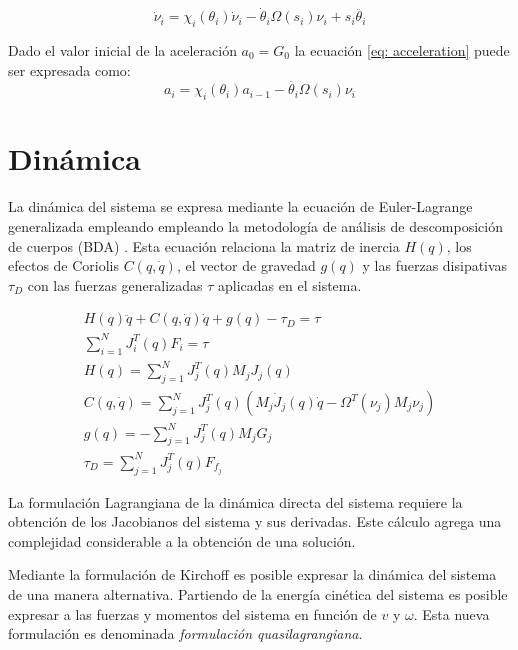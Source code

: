 \begin{equation}\label{eq: acceleration}
\dot \nu_i = \chi_i(\theta_i)\dot{\nu}_i - \dot \theta_i \Omega(s_i) \nu_i+ s_i\ddot{\theta_i}
\end{equation}

Dado el valor inicial de la aceleración 
$a_0 = G_0$ la ecuación \eqref{eq: acceleration} 
puede ser expresada como:
\begin{equation}
a_i = \chi_i(\theta_i) a_{i-1} - \dot{\theta_i}\Omega(s_i) \nu_i
\end{equation}

\section{Dinámica}

La dinámica del sistema se expresa mediante la ecuación 
de Euler-Lagrange generalizada empleando empleando la metodología 
de análisis de descomposición de cuerpos (BDA) \cite{olguin2019multibody}. 
Esta ecuación relaciona la matriz de inercia $H(q)$,
los efectos de Coriolis $C(q,\dot q)$, el vector de
gravedad $g(q)$ y las fuerzas disipativas $\tau_D$ con 
las fuerzas generalizadas $\tau$ aplicadas en el sistema.

\begin{subequations}\label{eq: lagrangiano_modelo}
\begin{align}
    H(  q) {\ddot{q}} + C(  q, {\dot q})\dot{q}  +g(q) - \tau_D  = \tau \\
    \sum_{i=1}^N J_i^T(q)F_i = \tau\\
    H(  q)  = \sum_{j=1}^N J_j^T(  q) M_j J_j(  q)\\
    C(  q,  {\dot q})  = \sum_{j=1}^N J_j^T(  q) \left ( M_j \dot J_j (  q) {\dot q} - \Omega^T(  \nu_j) M_j   \nu_j \right )\\
    g(  q)  = - \sum_{j=1}^N J_j^T(  q) M_j   G_j\\
    \tau_D  = \sum_{j=1}^N J_j^T(  q)   F_{f_{j}}
\end{align}
\end{subequations}


La formulación Lagrangiana de la dinámica directa del sistema requiere 
la obtención de los Jacobianos del sistema y sus derivadas.
Este cálculo agrega una complejidad considerable a la obtención
de una solución.

Mediante la formulación de Kirchoff \cite{olguin20183d}
es posible expresar la dinámica del sistema de una manera alternativa. 
Partiendo de la energía cinética del sistema es posible expresar
a las fuerzas y momentos del sistema en función de $v$ y $\omega$.
Esta nueva formulación es denominada \emph{formulación quasilagrangiana}.


